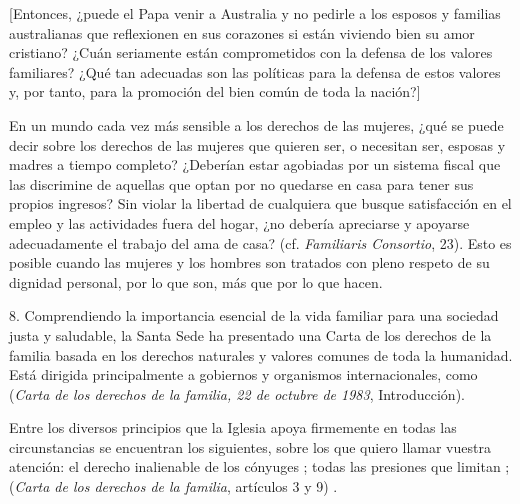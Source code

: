 \begin{body}
\begin{body}
		{[}Entonces, ¿puede el Papa venir a Australia y no pedirle a los esposos y familias australianas que reflexionen en sus corazones si están viviendo bien su amor cristiano? ¿Cuán seriamente están comprometidos con la defensa de los valores familiares? ¿Qué tan adecuadas son las políticas para la defensa de estos valores y, por tanto, para la promoción del bien común de toda la nación?{]}
		
		En un mundo cada vez más sensible a los derechos de las mujeres, ¿qué se puede decir sobre los derechos de las mujeres que quieren ser, o necesitan ser, esposas y madres a tiempo completo? ¿Deberían estar agobiadas por un sistema fiscal que las discrimine de aquellas que optan por no quedarse en casa para tener sus propios ingresos? Sin violar la libertad de cualquiera que busque satisfacción en el empleo y las actividades fuera del hogar, ¿no debería apreciarse y apoyarse adecuadamente el trabajo del ama de casa? (cf. \emph{Familiaris Consortio}, 23). Esto es posible cuando las mujeres y los hombres son tratados con pleno respeto de su dignidad personal, por lo que son, más que por lo que hacen.
		
		8. Comprendiendo la importancia esencial de la vida familiar para una sociedad justa y saludable, la Santa Sede ha presentado una Carta de los derechos de la familia basada en los derechos naturales y valores comunes de toda la humanidad. Está dirigida principalmente a gobiernos y organismos internacionales, como  (\emph{Carta de los derechos de la familia, 22 de octubre de 1983}, Introducción).
		
		Entre los diversos principios que la Iglesia apoya firmemente en todas las circunstancias se encuentran los siguientes, sobre los que quiero llamar vuestra atención: el derecho inalienable de los cónyuges ; todas las presiones que limitan ;  (\emph{Carta de los derechos de la familia}, artículos 3 y 9) .
		

\end{body}
\end{body}
